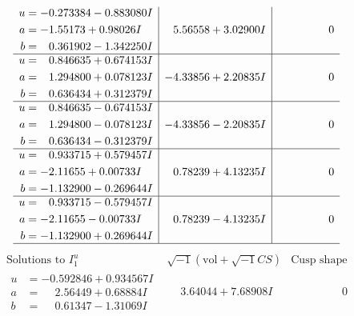 \documentclass[1p]{elsarticle_modified}
\theoremstyle{definition}
\newcommand{\I}{\sqrt{-1}}
\begin{document}
$$\begin{array}{c|c|c}
\begin{aligned}
u &= -0.273384 - 0.883080 I \\
a &= -1.55173 + 0.98026 I \\
b &= \phantom{-}0.361902 - 1.342250 I\end{aligned}
 & \phantom{-}5.56558 + 3.02900 I & \phantom{-0.000000 } 0 \\ \hline\begin{aligned}
u &= \phantom{-}0.846635 + 0.674153 I \\
a &= \phantom{-}1.294800 + 0.078123 I \\
b &= \phantom{-}0.636434 + 0.312379 I\end{aligned}
 & -4.33856 + 2.20835 I & \phantom{-0.000000 } 0 \\ \hline\begin{aligned}
u &= \phantom{-}0.846635 - 0.674153 I \\
a &= \phantom{-}1.294800 - 0.078123 I \\
b &= \phantom{-}0.636434 - 0.312379 I\end{aligned}
 & -4.33856 - 2.20835 I & \phantom{-0.000000 } 0 \\ \hline\begin{aligned}
u &= \phantom{-}0.933715 + 0.579457 I \\
a &= -2.11655 + 0.00733 I \\
b &= -1.132900 - 0.269644 I\end{aligned}
 & \phantom{-}0.78239 + 4.13235 I & \phantom{-0.000000 } 0 \\ \hline\begin{aligned}
u &= \phantom{-}0.933715 - 0.579457 I \\
a &= -2.11655 - 0.00733 I \\
b &= -1.132900 + 0.269644 I\end{aligned}
 & \phantom{-}0.78239 - 4.13235 I & \phantom{-0.000000 } 0\\
 \hline 
 \end{array}$$\newpage$$\begin{array}{c|c|c}  
\text{Solutions to }I^u_{1}& \I (\text{vol} + \sqrt{-1}CS) & \text{Cusp shape}\\
 \hline 
\begin{aligned}
u &= -0.592846 + 0.934567 I \\
a &= \phantom{-}2.56449 + 0.68884 I \\
b &= \phantom{-}0.61347 - 1.31069 I\end{aligned}
 & \phantom{-}3.64044 + 7.68908 I & \phantom{-0.000000 } 0 \\ \hline\begin{aligned}

\end{aligned}
\end{array}$$
\end{document}
